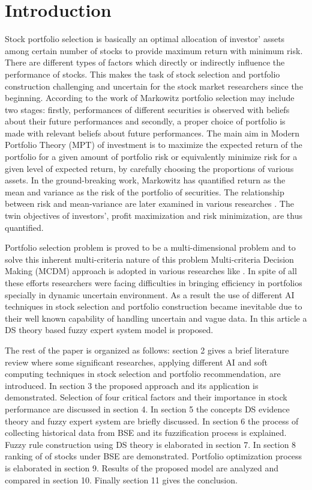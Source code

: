 \documentclass{ws-ijufks}
\begin{document}
\section{Introduction}	
Stock portfolio selection is basically an optimal allocation of investor' assets among 
certain number of stocks to provide maximum return with minimum risk. There are different 
types of factors which directly or indirectly influence the performance of stocks. This 
makes the task of stock selection and portfolio construction challenging and uncertain 
for the stock market researchers since the beginning. According to the work of Markowitz 
\cite{Markowitz1952} portfolio selection may include two stages: firstly, performances of 
different securities is observed with beliefs about their future performances and 
secondly, a proper choice of portfolio is made with relevant beliefs about future 
performances. The main aim in Modern Portfolio Theory (MPT) of investment is to maximize 
the expected return of the portfolio for a given amount of portfolio risk or  
equivalently  minimize risk for a given level of expected return, by carefully choosing 
the proportions of various assets. In the ground-breaking work, Markowitz 
\cite{Markowitz1952} has quantified return as the mean and variance as the risk of the 
portfolio of securities. The relationship between risk and mean-variance are later 
examined in various researches \cite{Zhou2000,Fang2006,Ogryczak2000,Huang2008}. The twin 
objectives of investors', profit maximization and risk minimization, are thus quantified.

Portfolio selection problem is proved to be a multi-dimensional problem and to solve this 
inherent multi-criteria nature of this problem Multi-criteria Decision Making (MCDM) 
approach is adopted in various researches like 
\cite{Xidonas2011,Edwards2007,Abdollahzadeh2002,Siskos1989}. In spite of all these 
efforts researchers were facing difficulties in bringing efficiency in portfolios 
specially in dynamic uncertain environment. As a result the use of different AI 
techniques in stock selection and portfolio construction became inevitable due to their 
well known capability of handling uncertain and vague data. In this article a DS theory 
based fuzzy expert system model is proposed. 

The rest of the paper is organized as follows: section 2 gives a brief literature review 
where some significant researches, applying different AI and soft computing techniques in 
stock selection and portfolio recommendation, are introduced. In section 3 the proposed 
approach and its application is demonstrated. Selection of four critical factors and 
their importance in stock performance are discussed in section 4. In section 5 the 
concepts DS evidence theory and fuzzy expert system are briefly discussed. In section 6 
the process of collecting historical data from BSE and its fuzzification process is 
explained. Fuzzy rule construction using DS theory is elaborated in section 7. In section 
8 ranking of of stocks under BSE are demonstrated. Portfolio optimization process is 
elaborated in section 9. Results of the proposed model are analyzed and compared in 
section 10. Finally section 11 gives the conclusion.
\end{document}
